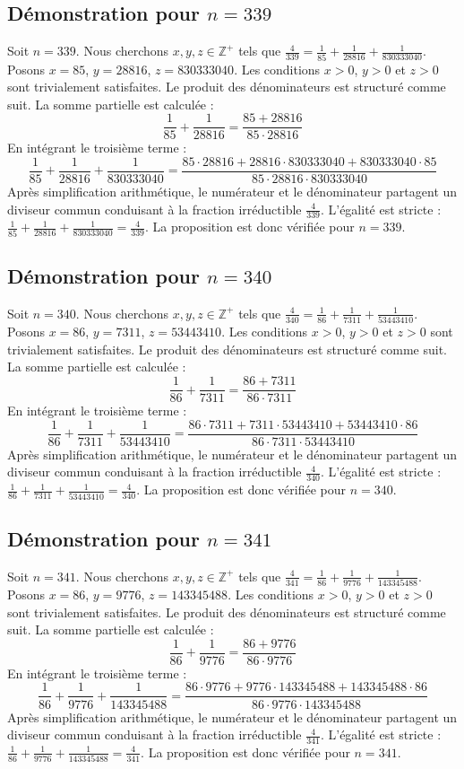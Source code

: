 \documentclass[11pt,a4paper]{article}
\begin{document}
\subsection{Démonstration pour $n = 339$}
Soit $n = 339$. Nous cherchons $x, y, z \in \mathbb{Z}^{+}$ tels que $\frac{4}{339} = \frac{1}{85} + \frac{1}{28816} + \frac{1}{830333040}$.
Posons $x = 85$, $y = 28816$, $z = 830333040$.
Les conditions $x > 0$, $y > 0$ et $z > 0$ sont trivialement satisfaites.
Le produit des dénominateurs est structuré comme suit. La somme partielle est calculée :
$$ \frac{1}{85} + \frac{1}{28816} = \frac{85+28816}{85 \cdot 28816} $$
En intégrant le troisième terme :
$$ \frac{1}{85} + \frac{1}{28816} + \frac{1}{830333040} = \frac{85 \cdot 28816 + 28816 \cdot 830333040 + 830333040 \cdot 85}{85 \cdot 28816 \cdot 830333040} $$
Après simplification arithmétique, le numérateur et le dénominateur partagent un diviseur commun conduisant à la fraction irréductible $\frac{4}{339}$.
L'égalité est stricte : $\frac{1}{85} + \frac{1}{28816} + \frac{1}{830333040} = \frac{4}{339}$.
La proposition est donc vérifiée pour $n = 339$.
\subsection{Démonstration pour $n = 340$}
Soit $n = 340$. Nous cherchons $x, y, z \in \mathbb{Z}^{+}$ tels que $\frac{4}{340} = \frac{1}{86} + \frac{1}{7311} + \frac{1}{53443410}$.
Posons $x = 86$, $y = 7311$, $z = 53443410$.
Les conditions $x > 0$, $y > 0$ et $z > 0$ sont trivialement satisfaites.
Le produit des dénominateurs est structuré comme suit. La somme partielle est calculée :
$$ \frac{1}{86} + \frac{1}{7311} = \frac{86+7311}{86 \cdot 7311} $$
En intégrant le troisième terme :
$$ \frac{1}{86} + \frac{1}{7311} + \frac{1}{53443410} = \frac{86 \cdot 7311 + 7311 \cdot 53443410 + 53443410 \cdot 86}{86 \cdot 7311 \cdot 53443410} $$
Après simplification arithmétique, le numérateur et le dénominateur partagent un diviseur commun conduisant à la fraction irréductible $\frac{4}{340}$.
L'égalité est stricte : $\frac{1}{86} + \frac{1}{7311} + \frac{1}{53443410} = \frac{4}{340}$.
La proposition est donc vérifiée pour $n = 340$.
\subsection{Démonstration pour $n = 341$}
Soit $n = 341$. Nous cherchons $x, y, z \in \mathbb{Z}^{+}$ tels que $\frac{4}{341} = \frac{1}{86} + \frac{1}{9776} + \frac{1}{143345488}$.
Posons $x = 86$, $y = 9776$, $z = 143345488$.
Les conditions $x > 0$, $y > 0$ et $z > 0$ sont trivialement satisfaites.
Le produit des dénominateurs est structuré comme suit. La somme partielle est calculée :
$$ \frac{1}{86} + \frac{1}{9776} = \frac{86+9776}{86 \cdot 9776} $$
En intégrant le troisième terme :
$$ \frac{1}{86} + \frac{1}{9776} + \frac{1}{143345488} = \frac{86 \cdot 9776 + 9776 \cdot 143345488 + 143345488 \cdot 86}{86 \cdot 9776 \cdot 143345488} $$
Après simplification arithmétique, le numérateur et le dénominateur partagent un diviseur commun conduisant à la fraction irréductible $\frac{4}{341}$.
L'égalité est stricte : $\frac{1}{86} + \frac{1}{9776} + \frac{1}{143345488} = \frac{4}{341}$.
La proposition est donc vérifiée pour $n = 341$.
\end{document}
